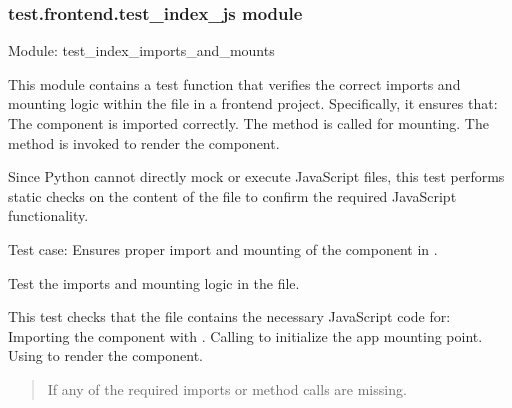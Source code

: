 \documentclass[letterpaper,10pt,english]{sphinxmanual}
\begin{document}
\subsubsection{test.frontend.test\_index\_js module}
\label{\detokenize{test.frontend:module-test.frontend.test_index_js}}\label{\detokenize{test.frontend:test-frontend-test-index-js-module}}
\sphinxAtStartPar
Module: test\_index\_imports\_and\_mounts

\sphinxAtStartPar
This module contains a test function that verifies the correct imports and mounting logic
within the  file in a frontend project. Specifically, it ensures that:
\sphinxhyphen{} The  component is imported correctly.
\sphinxhyphen{} The  method is called for mounting.
\sphinxhyphen{} The  method is invoked to render the  component.

\sphinxAtStartPar
Since Python cannot directly mock or execute JavaScript files, this test performs static checks on
the content of the  file to confirm the required JavaScript functionality.

\sphinxAtStartPar
Test case:
\sphinxhyphen{} Ensures proper import and mounting of the  component in .

\begin{fulllineitems}
\label{\detokenize{test.frontend:test.frontend.test_index_js.test_index_imports_and_mounts}}
\pysigstartsignatures
\pysiglinewithargsret
{}
{}
{}
\pysigstopsignatures
\sphinxAtStartPar
Test the imports and mounting logic in the  file.

\sphinxAtStartPar
This test checks that the  file contains the necessary JavaScript code for:
\sphinxhyphen{} Importing the  component with .
\sphinxhyphen{} Calling  to initialize the app mounting point.
\sphinxhyphen{} Using  to render the  component.
\begin{quote}\begin{description}
\sphinxAtStartPar
{} \textendash{} If any of the required imports or method calls are missing.

\end{description}\end{quote}

\end{fulllineitems}
\end{document}

